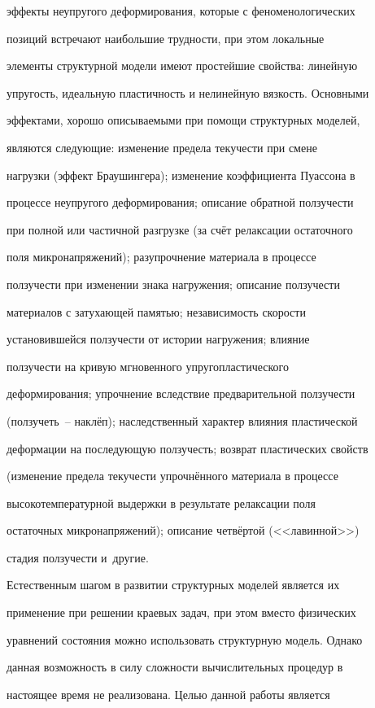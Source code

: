 эффекты неупругого деформирования, которые с феноменологических

позиций встречают наибольшие трудности, при этом локальные

элементы структурной модели имеют простейшие свойства: линейную

упругость, идеальную пластичность и нелинейную вязкость. Основными

эффектами, хорошо описываемыми при помощи структурных моделей,

являются следующие:  изменение предела текучести при смене

нагрузки (эффект Браушингера); изменение коэффициента Пуассона в

процессе неупругого деформирования; описание обратной ползучести

при полной или частичной разгрузке (за счёт релаксации остаточного

поля микронапряжений); разупрочнение материала в процессе

ползучести при изменении знака нагружения; описание ползучести

материалов с затухающей памятью; независимость скорости

установившейся ползучести от истории нагружения; влияние

ползучести на кривую мгновенного упругопластического

деформирования; упрочнение вследствие предварительной ползучести

(ползучеть~-- наклёп); наследственный характер влияния пластической

деформации на последующую ползучесть; возврат пластических свойств

(изменение предела текучести упрочнённого материала в процессе

высокотемпературной выдержки в результате релаксации поля

остаточных микронапряжений); описание четвёртой (<<лавинной>>)

стадия ползучести и~другие.



Естественным шагом в развитии структурных моделей является их

применение при решении краевых задач, при этом вместо физических

уравнений состояния можно использовать структурную модель. Однако

данная возможность в силу сложности вычислительных процедур в

настоящее время не реализована. Целью данной работы является

